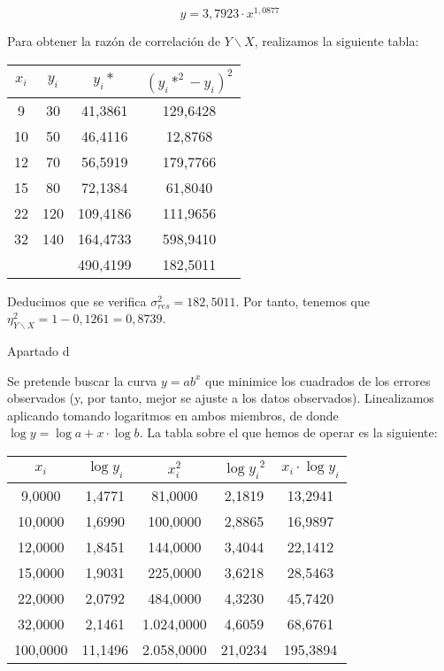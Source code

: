 $$y=3,7923·x^{1,0877}$$

Para obtener la razón de correlación de $Y\backslash X$, realizamos la siguiente tabla:

\begin{center}
	\begin{tabular}{|c|c|c|c|}
	\hline
$x_i$ & $y_i$ & $y_i*$ & $(y_i*^2-y_i)^2$ \\ \hline
9 & 30 & 41,3861 & 129,6428 \\ 
10 & 50 & 46,4116 & 12,8768 \\ 
12 & 70 & 56,5919 & 179,7766 \\ 
15 & 80 & 72,1384 & 61,8040 \\ 
22 & 120 & 109,4186 & 111,9656 \\ 
32 & 140 & 164,4733 & 598,9410 \\ \hline
 & & 490,4199 & 182,5011 \\ \hline
\end{tabular}
\end{center}

Deducimos que se verifica $\sigma_{res}^2 = 182,5011$. Por tanto, tenemos que $\eta_{Y\backslash X}^2 = 1 - 0,1261 = 0,8739$.

Apartado d

Se pretende buscar la curva $y =  ab^x$ que minimice los cuadrados de los errores observados (y, por tanto, mejor se ajuste a los datos observados). Linealizamos aplicando tomando logaritmos en ambos miembros, de donde $\log{y} = \log{a} + x·\log{b}$. La tabla sobre el que hemos de operar es la siguiente:

\begin{center}
	\begin{tabular}{ c|c|c c c }
	
	$x_i$ & $\log{y_i}$ & $x_i^2$ & $\log{y_i}^2$ & $x_i·\log{y_i}$ \\ \hline
	9,0000 & 1,4771 & 81,0000 & 2,1819 & 13,2941 \\ 
	10,0000 & 1,6990 & 100,0000 & 2,8865 & 16,9897 \\ 
	12,0000 & 1,8451 & 144,0000 & 3,4044 & 22,1412 \\ 
	15,0000 & 1,9031 & 225,0000 & 3,6218 & 28,5463 \\ 
	22,0000 & 2,0792 & 484,0000 & 4,3230 & 45,7420 \\ 
	32,0000 & 2,1461 & 1.024,0000 & 4,6059 & 68,6761 \\ \hline
	100,0000 & 11,1496 & 2.058,0000 & 21,0234 & 195,3894 \\ 
\end{tabular}
\end{center}



